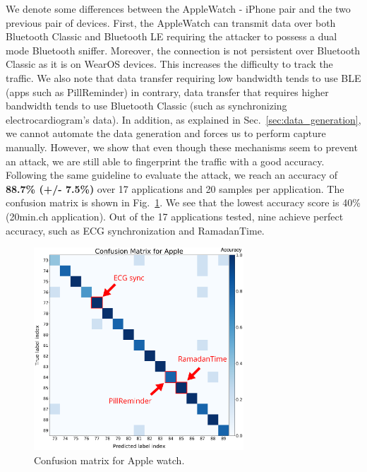 We denote some differences between the AppleWatch - iPhone pair and the two previous pair of devices. First, the AppleWatch can transmit data over both Bluetooth Classic and Bluetooth LE requiring the attacker to possess a dual mode Bluetooth sniffer. Moreover, the connection is not persistent over Bluetooth Classic as it is on WearOS devices. This increases the difficulty to track the traffic. We also note that data transfer requiring low bandwidth tends to use BLE (apps such as PillReminder) in contrary, data transfer that requires higher bandwidth tends to use Bluetooth Classic (such as synchronizing electrocardiogram's data). In addition, as explained in Sec.~\ref{sec:data_generation}, we cannot automate the data generation and forces us to perform capture manually.  However, we show that even though these mechanisms seem to prevent an attack, we are still able to fingerprint the traffic with a good accuracy. Following the same guideline to evaluate the attack, we reach an accuracy of \textbf{88.7\% (+/- 7.5\%)} over 17 applications and 20 samples per application. The confusion matrix is shown in Fig.~\ref{fig:cm_iwatch}. We see that the lowest accuracy score is 40\% (20min.ch application). Out of the 17 applications tested, nine achieve perfect accuracy, such as ECG synchronization and RamadanTime.  




\begin{figure}[H]
 \centering
 \includegraphics[width=0.7\textwidth]{figures/cm/Confusion_matrix_for_iwatch_annoted.png}
 \caption{Confusion matrix for Apple watch.}
 \label{fig:cm_iwatch}
\end{figure}






